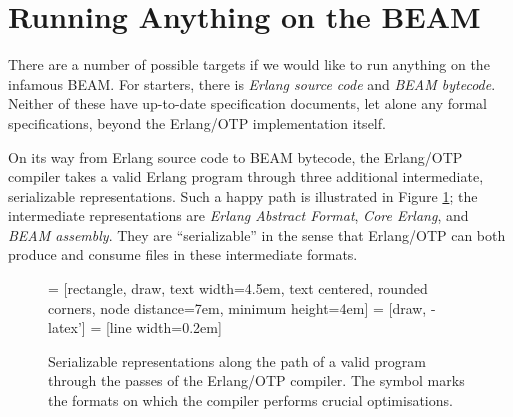 \section{Running Anything on the BEAM}

There are a number of possible targets if we would like to run
anything on the infamous BEAM. For starters, there is \emph{Erlang
source code} and \emph{BEAM bytecode}. Neither of these have
up-to-date specification documents\footnotemark, let alone any formal
specifications, beyond the Erlang/OTP implementation itself.


On its way from Erlang source code to BEAM bytecode, the Erlang/OTP
compiler takes a valid Erlang program through three additional
intermediate, serializable representations. Such a happy path is
illustrated in Figure \ref{fig:serializable-representations}; the
intermediate representations are \emph{Erlang Abstract Format},
\emph{Core Erlang}, and \emph{BEAM assembly}.  They are
``serializable'' in the sense that Erlang/OTP can both produce and
consume files in these intermediate formats.

\NewDocumentCommand\optimizing{}{$\circlearrowright$}

\begin{figure}[h]
\centering
{} = [rectangle, draw, 
    text width=4.5em, text centered, rounded corners,
    node distance=7em,
    minimum height=4em]
 = [draw, -latex']
 = [line width=0.2em]


\caption{Serializable representations along the path of a valid
program through the passes of the Erlang/OTP compiler. The symbol
\optimizing{} marks the formats on which the compiler performs crucial
optimisations.}

\label{fig:serializable-representations}
\end{figure}

